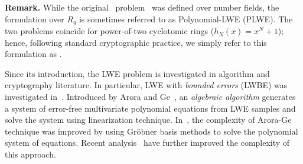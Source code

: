 \textbf{Remark.} While the original \rlwe\ problem~\cite{EC:LyuPeiReg10} was defined over number fields, the formulation over $R_q$ is sometimes referred to as Polynomial-LWE (PLWE). The two problems coincide for power-of-two cyclotomic rings ($h_N(x) = x^N+1$); hence, following standard cryptographic practice, we simply refer to this formulation as \rlwe. 

    
   


        
    

  
Since its introduction, the LWE problem is investigated in algorithm and cryptography literature. In particular, LWE with \emph{bounded errors} (LWBE) was investigated in~\cite{EPRINT:ACFP14,ICALP:AroGe11,EC:NMSU25,EPRINT:Steiner24b}. Introduced by Arora and Ge~\cite{ICALP:AroGe11}, an \emph{algebraic algorithm} generates a system of error-free multivariate polynomial equations from LWE samples and solve the system using linearization technique. In~\cite{EPRINT:ACFP14}, the complexity of Arora-Ge technique was improved by using Gr{\"o}bner basis methods to solve the polynomial system of equations. Recent analysis~\cite{EC:NMSU25,EPRINT:Steiner24b} have further improved the complexity of this approach.

